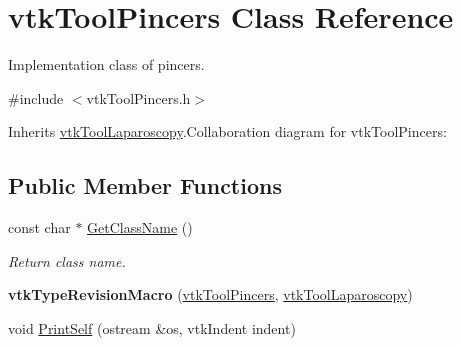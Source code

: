 \hypertarget{classvtkToolPincers}{
\section{vtkToolPincers Class Reference}
\label{classvtkToolPincers}
}


Implementation class of pincers.  


{\ttfamily \#include $<$vtkToolPincers.h$>$}

Inherits \hyperlink{classvtkToolLaparoscopy}{vtkToolLaparoscopy}.Collaboration diagram for vtkToolPincers:\subsection*{Public Member Functions}
\begin{DoxyCompactItemize}
\item 
\hypertarget{classvtkToolPincers_a6661419bfbcf7514872938af5a08495a}{
const char $\ast$ \hyperlink{classvtkToolPincers_a6661419bfbcf7514872938af5a08495a}{GetClassName} ()}
\label{classvtkToolPincers_a6661419bfbcf7514872938af5a08495a}

\begin{DoxyCompactList}\small\item\em Return class name. \item\end{DoxyCompactList}\item 
\hypertarget{classvtkToolPincers_a871bfe207f7733755b8912751cf2f58c}{
{\bfseries vtkTypeRevisionMacro} (\hyperlink{classvtkToolPincers}{vtkToolPincers}, \hyperlink{classvtkToolLaparoscopy}{vtkToolLaparoscopy})}
\label{classvtkToolPincers_a871bfe207f7733755b8912751cf2f58c}

\item 
\hypertarget{classvtkToolPincers_a16520112493e44a56045b00a1f65ba34}{
void \hyperlink{classvtkToolPincers_a16520112493e44a56045b00a1f65ba34}{PrintSelf} (ostream \&os, vtkIndent indent)}
\label{classvtkToolPincers_a16520112493e44a56045b00a1f65ba34}


\end{DoxyCompactItemize}

